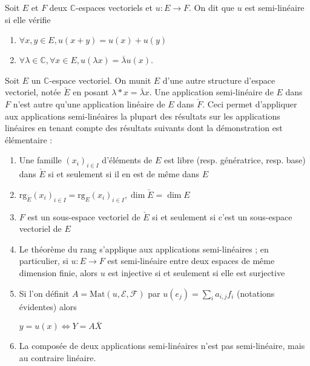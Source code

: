 \begin{de}
Soit $E$ et $F$ deux $\mathbb{C}$-espaces vectoriels et $u : E \rightarrow F$. On dit que $u$ est semi-linéaire si elle vérifie
\begin{enumerate}
\item $\forall x,y \in E, u(x + y) = u(x) + u(y)$
\item $\forall \lambda \in \mathbb{C}, \forall x \in E, u(\lambda x) = \overline{\lambda} u(x)$.
\end{enumerate}
\end{de}

\begin{rem}
Soit $E$ un $\mathbb{C}$-espace vectoriel. On munit $E$ d'une autre structure d'espace vectoriel, notée $\check{E}$ en posant $\lambda * x = \overline{\lambda} x$. Une application semi-linéaire de $E$ dans $F$ n'est autre qu'une application linéaire de $E$ dans $\check{F}$. Ceci permet d'appliquer aux applications semi-linéaires la plupart des résultats sur les applications linéaires en tenant compte des résultats suivants dont la démonstration est élémentaire :

\begin{enumerate}
\item Une famille $(x_i)_{i\in I}$ d'éléments de $E$ est libre (resp. génératrice, resp. base) dans $\check{E}$ si et seulement si il en est de même dans $E$
\item $\mathrm{rg}_{\check{E}}(x_i)_{i\in I} = \mathrm{rg}_E(x_i)_{i\in I}, \dim \check{E} = \dim E$
\item $F$ est un sous-espace vectoriel de $\check{E}$ si et seulement si c'est un sous-espace vectoriel de $E$
\item Le théorème du rang s'applique aux applications semi-linéaires ; en particulier, si $u : E \rightarrow F$ est semi-linéaire entre deux espaces de même dimension finie, alors $u$ est injective si et seulement si elle est surjective
\item Si l'on définit $A = \mathrm{Mat}(u,\mathcal{E},\mathcal{F})$ par $u(e_j) = \sum_i a_{i,j} f_i$ (notations évidentes) alors

$y = u(x) \Leftrightarrow Y = A \overline{X}$

\item La composée de deux applications semi-linéaires n'est pas semi-linéaire, mais au contraire linéaire.
\end{enumerate}
\end{rem}


